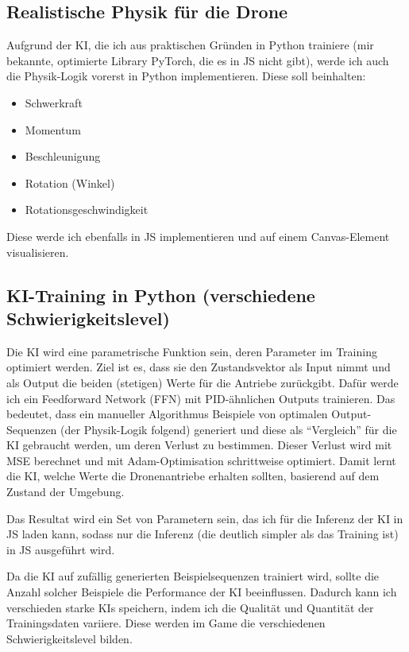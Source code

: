 \documentclass[8pt]{extarticle}
\begin{document}
\subsection{Realistische Physik für die Drone}
Aufgrund der KI, die ich aus praktischen Gründen in Python trainiere (mir bekannte, optimierte Library PyTorch, die es in JS nicht gibt), werde ich auch die Physik-Logik vorerst in Python implementieren. Diese soll beinhalten:
\vspace{-1em}
\begin{itemize}
\setlength{\parskip}{0em}
  \item Schwerkraft
  \item Momentum
  \item Beschleunigung
  \item Rotation (Winkel)
  \item Rotationsgeschwindigkeit
\end{itemize}
\vspace{-1em}
\noindent
Diese werde ich ebenfalls in JS implementieren und auf einem Canvas-Element visualisieren.

\subsection{KI-Training in Python (verschiedene Schwierigkeitslevel)}
Die KI wird eine parametrische Funktion sein, deren Parameter im Training optimiert werden. Ziel ist es, dass sie den Zustandsvektor als Input nimmt und als Output die beiden (stetigen) Werte für die Antriebe zurückgibt. Dafür werde ich ein Feedforward Network (FFN) mit PID-ähnlichen Outputs trainieren. Das bedeutet, dass ein manueller Algorithmus Beispiele von optimalen Output-Sequenzen (der Physik-Logik folgend) generiert und diese als ``Vergleich'' für die KI gebraucht werden, um deren Verlust zu bestimmen. Dieser Verlust wird mit MSE berechnet und mit Adam-Optimisation schrittweise optimiert. Damit lernt die KI, welche Werte die Dronenantriebe erhalten sollten, basierend auf dem Zustand der Umgebung.

Das Resultat wird ein Set von Parametern sein, das ich für die Inferenz der KI in JS laden kann, sodass nur die Inferenz (die deutlich simpler als das Training ist) in JS ausgeführt wird.

Da die KI auf zufällig generierten Beispielsequenzen trainiert wird, sollte die Anzahl solcher Beispiele die Performance der KI beeinflussen. Dadurch kann ich verschieden starke KIs speichern, indem ich die Qualität und Quantität der Trainingsdaten variiere. Diese werden im Game die verschiedenen Schwierigkeitslevel bilden.
\end{document}
